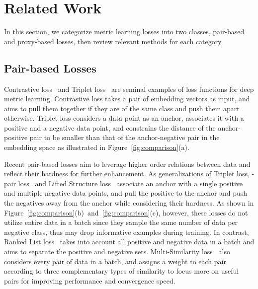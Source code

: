 \documentclass[10pt,twocolumn,letterpaper]{article}
\begin{document}
 




\section{Related Work}
\label{sec:relatedwork}
In this section, we categorize metric learning losses into two classes, pair-based and proxy-based losses, then review relevant methods for each category. 


\subsection{Pair-based Losses}
\label{sec:pair_loss}






Contrastive loss~\cite{Bromley1994, Chopra2005, Hadsell2006} and Triplet loss~\cite{Wang2014, Schroff2015} are seminal examples of loss functions for deep metric learning.
Contrastive loss takes a pair of embedding vectors as input, and aims to pull them together if they are of the same class and push them apart otherwise.
Triplet loss considers a data point as an anchor, associates it with a positive and a negative data point, and constrains the distance of the anchor-positive pair to be smaller than that of the anchor-negative pair in the embedding space as illustrated in Figure~\ref{fig:comparison}(a).

Recent pair-based losses aim to leverage higher order relations between data and reflect their hardness for further enhancement.
As generalizations of Triplet loss, -pair loss~\cite{Sohn_nips2016} and Lifted Structure loss~\cite{songCVPR16} associate an anchor with a single positive and multiple negative data points, and pull the positive to the anchor and push the negatives away from the anchor while considering their hardness.
As shown in Figure~\ref{fig:comparison}(b)~and~\ref{fig:comparison}(c), however, these losses do not utilize entire data in a batch since they sample the same number of data per negative class, thus may drop informative examples during training.
In contrast, Ranked List loss~\cite{wang2019ranked} takes into account all positive and negative data in a batch and aims to separate the positive and negative sets. Multi-Similarity loss~\cite{wang2019multi} also considers every pair of data in a batch, and assigns a weight to each pair according to three complementary types of similarity to focus more on useful pairs 
for improving performance and convergence speed.
\end{document}
